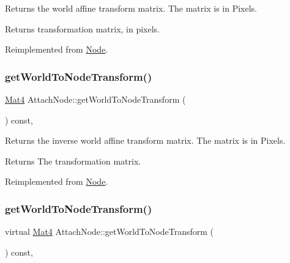 Returns the world affine transform matrix. The matrix is in Pixels.

\begin{DoxyReturn}{Returns}
transformation matrix, in pixels. 
\end{DoxyReturn}


Reimplemented from \hyperlink{classNode_a1e46065101d0d5dba32262067d85bf23}{Node}.

\mbox{\label{classAttachNode_a983b98880a9e8b42dcf78720f4fae50e}} 
\subsubsection{\texorpdfstring{get\+World\+To\+Node\+Transform()}{getWorldToNodeTransform()}\hspace{0.1cm}{\footnotesize\ttfamily [1/2]}}
{\footnotesize\ttfamily \hyperlink{classMat4}{Mat4} Attach\+Node\+::get\+World\+To\+Node\+Transform (\begin{DoxyParamCaption}{ }\end{DoxyParamCaption}) const\hspace{0.3cm}{\ttfamily [override]}, {\ttfamily [virtual]}}

Returns the inverse world affine transform matrix. The matrix is in Pixels.

\begin{DoxyReturn}{Returns}
The transformation matrix. 
\end{DoxyReturn}


Reimplemented from \hyperlink{classNode_ab41da5111de6d98710d0497e35063989}{Node}.

\mbox{\label{classAttachNode_a566ef52d5a8c5f036322a4fb5f63c668}} 
\subsubsection{\texorpdfstring{get\+World\+To\+Node\+Transform()}{getWorldToNodeTransform()}\hspace{0.1cm}{\footnotesize\ttfamily [2/2]}}
{\footnotesize\ttfamily virtual \hyperlink{classMat4}{Mat4} Attach\+Node\+::get\+World\+To\+Node\+Transform (\begin{DoxyParamCaption}{ }\end{DoxyParamCaption}) const\hspace{0.3cm}{\ttfamily [override]}, {\ttfamily [virtual]}}

